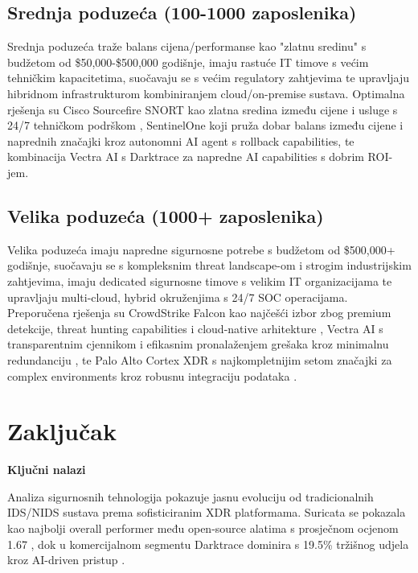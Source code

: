 \documentclass[utf8, seminar]{fer}
\begin{document}
\section{Srednja poduzeća (100-1000 zaposlenika)}

Srednja poduzeća traže balans cijena/performanse kao "zlatnu sredinu" s budžetom od \$50,000-\$500,000 godišnje, imaju rastuće IT timove s većim tehničkim kapacitetima, suočavaju se s većim regulatory zahtjevima te upravljaju hibridnom infrastrukturom kombiniranjem cloud/on-premise sustava. Optimalna rješenja su Cisco Sourcefire SNORT kao zlatna sredina između cijene i usluge s 24/7 tehničkom podrškom \cite{peerspot_snort_darktrace}, SentinelOne koji pruža dobar balans između cijene i naprednih značajki kroz autonomni AI agent s rollback capabilities, te kombinacija Vectra AI s Darktrace za napredne AI capabilities s dobrim ROI-jem.

\section{Velika poduzeća (1000+ zaposlenika)}

Velika poduzeća imaju napredne sigurnosne potrebe s budžetom od \$500,000+ godišnje, suočavaju se s kompleksnim threat landscape-om i strogim industrijskim zahtjevima, imaju dedicated sigurnosne timove s velikim IT organizacijama te upravljaju multi-cloud, hybrid okruženjima s 24/7 SOC operacijama. Preporučena rješenja su CrowdStrike Falcon kao najčešći izbor zbog premium detekcije, threat hunting capabilities i cloud-native arhitekture \cite{g2_crowdstrike_comparison}, Vectra AI s transparentnim cjennikom i efikasnim pronalaženjem grešaka kroz minimalnu redundanciju \cite{peerspot_vectra_pros}, te Palo Alto Cortex XDR s najkompletnijim setom značajki za complex environments kroz robusnu integraciju podataka \cite{g2_cortex_comparison}.

\chapter{Zaključak}

\textbf{Ključni nalazi}

Analiza sigurnosnih tehnologija pokazuje jasnu evoluciju od tradicionalnih IDS/NIDS sustava prema sofisticiranim XDR platformama. Suricata se pokazala kao najbolji overall performer među open-source alatima s prosječnom ocjenom 1.67 \cite{sans_comparative_study}, dok u komercijalnom segmentu Darktrace dominira s 19.5\% tržišnog udjela kroz AI-driven pristup \cite{peerspot_snort_darktrace}.
\end{document}
